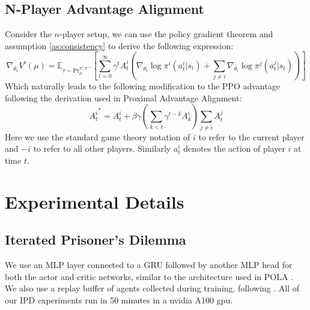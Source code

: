 \documentclass{article} \usepackage{iclr2025_conference,times}
\begin{document}
\subsection{N-Player Advantage Alignment}
Consider the $n$-player setup, we can use the policy gradient theorem and assumption \ref{as:consistency} to derive the following expression:
\begin{equation}
    \nabla_{\theta_1}V^{i}(\mu) = \mathbb{E}_{\tau \sim \text{Pr}_{\mu}^{\pi^i, \pi^{-i}}} \left[\sum_{t=0}^\infty \gamma^t A^i_t \left(\nabla_{\theta_i} \log \pi^i (a^i_t | s_t) + \sum_{j \neq i}\nabla_{\theta_i} \log \pi^j (a^j_t | s_t)\right)\right]
\end{equation}
Which naturally leads to the following modification to the PPO advantage following the derivation used in Proximal Advantage Alignment:
\begin{equation}
    {A^i_t}^* = A^i_t + \beta \gamma \left(\sum_{k<t} \gamma^{t-k} A^{i}_k \right) \sum_{j \neq i} A^j_t
\end{equation}
Here we use the standard game theory notation of $i$ to refer to the current player and $-i$ to refer to all other players. Similarly $a^i_t$ denotes the action of player $i$ at time $t$.
\newpage

\section{Experimental Details}
\label{app:Experiments}

\subsection{Iterated Prisoner's Dilemma}
\label{app:IPD}
We use an MLP layer connected to a GRU followed by another MLP head for both the actor and critic networks, similar to the architecture used in POLA \citep{zhao2022proximal}. We also use a replay buffer of agents collected during training, following \cite{aghajohari2024loqa}. All of our IPD experiments run in 50 minutes in a nvidia A100 gpu.
\end{document}

